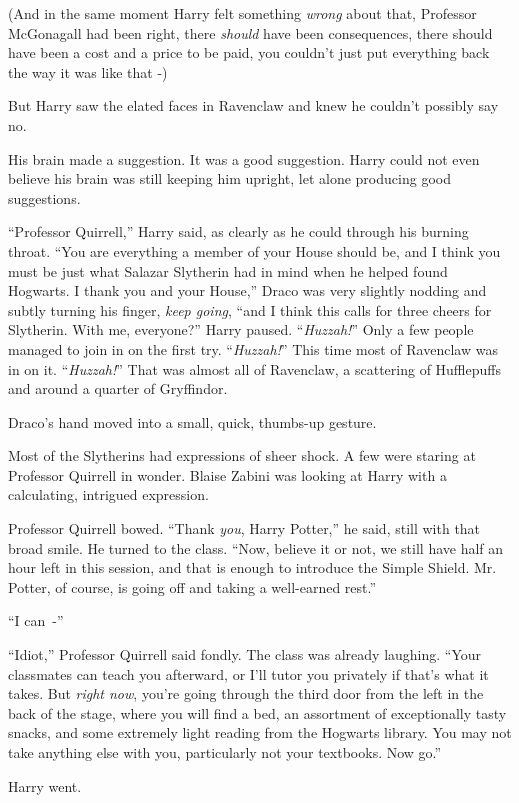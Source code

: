 (And in the same moment Harry felt something \emph{wrong} about that, Professor McGonagall had been right, there \emph{should} have been consequences, there should have been a cost and a price to be paid, you couldn't just put everything back the way it was like that -)

But Harry saw the elated faces in Ravenclaw and knew he couldn't possibly say no.

His brain made a suggestion. It was a good suggestion. Harry could not even believe his brain was still keeping him upright, let alone producing good suggestions.

``Professor Quirrell,'' Harry said, as clearly as he could through his burning throat. ``You are everything a member of your House should be, and I think you must be just what Salazar Slytherin had in mind when he helped found Hogwarts. I thank you and your House,'' Draco was very slightly nodding and subtly turning his finger, \emph{keep going}, ``and I think this calls for three cheers for Slytherin. With me, everyone?'' Harry paused. ``\emph{Huzzah!}'' Only a few people managed to join in on the first try. ``\emph{Huzzah!}'' This time most of Ravenclaw was in on it. ``\emph{Huzzah!}'' That was almost all of Ravenclaw, a scattering of Hufflepuffs and around a quarter of Gryffindor.

Draco's hand moved into a small, quick, thumbs-up gesture.

Most of the Slytherins had expressions of sheer shock. A few were staring at Professor Quirrell in wonder. Blaise Zabini was looking at Harry with a calculating, intrigued expression.

Professor Quirrell bowed. ``Thank \emph{you}, Harry Potter,'' he said, still with that broad smile. He turned to the class. ``Now, believe it or not, we still have half an hour left in this session, and that is enough to introduce the Simple Shield. Mr. Potter, of course, is going off and taking a well-earned rest.''

``I can~-''

``Idiot,'' Professor Quirrell said fondly. The class was already laughing. ``Your classmates can teach you afterward, or I'll tutor you privately if that's what it takes. But \emph{right now}, you're going through the third door from the left in the back of the stage, where you will find a bed, an assortment of exceptionally tasty snacks, and some extremely light reading from the Hogwarts library. You may not take anything else with you, particularly not your textbooks. Now go.''

Harry went.
